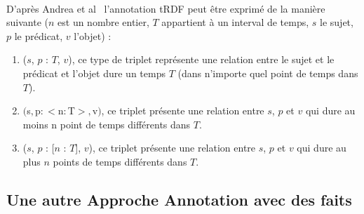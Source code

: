 \documentclass[12pt,a4	]{report}
\begin{document}
\paragraph{}
D'après Andrea et al~\cite{pugliese2008} l’annotation tRDF peut être exprimé de la manière suivante ($n$ est un nombre entier, $T$ appartient à un interval de temps, $s$ le sujet, $p$ le prédicat, $v$ l'objet) :
\begin{enumerate}
\item ($s$, $p$ : {$T$}, $v$), ce type de triplet représente une relation entre le sujet et le prédicat et l'objet dure un temps $T$ (dans n'importe quel point de temps dans $T$).
\item $($s$, $p$ : <$n$ : $T$>, $v$)$, ce triplet présente une relation entre $s$, $p$ et $v$ qui dure au moins n point de temps différents dans $T$.
\item ($s$, $p$ : [$n$ : $T$], $v$), ce triplet présente une relation entre $s$, $p$ et $v$ qui dure au plus $n$ points de temps différents dans $T$. 
\end{enumerate}
\subsection*{Une autre Approche Annotation avec des faits}
\end{document}
